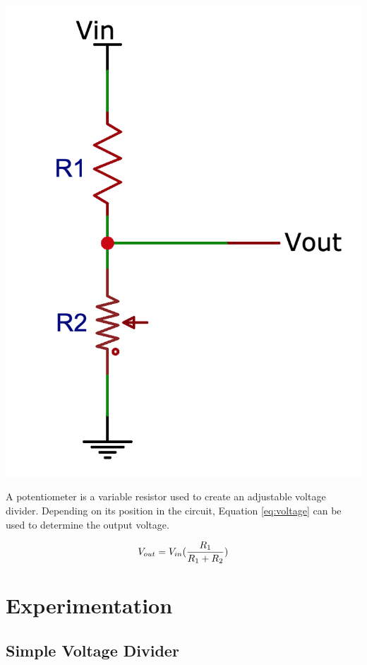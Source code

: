 \documentclass[journal]{IEEEtran}
\begin{document}
\begingroup
    \medskip
    \centering
    \includegraphics[scale=0.5]{images/lab1_1.png}
    \label{fig:first}
    \medskip
\endgroup

\noindent A potentiometer is a variable resistor used to create an adjustable voltage divider. Depending on its position in the circuit, Equation \ref{eq:voltage} can be used to determine the output voltage.   

\begin{equation}
V_{out} = V_{in} (\frac{R\textsubscript{1}}{R\textsubscript{1} + R\textsubscript{2}})
\label{eq:voltage}
\end{equation}


\smallskip
\section{Experimentation}
\subsection{Simple Voltage Divider}
\end{document}
